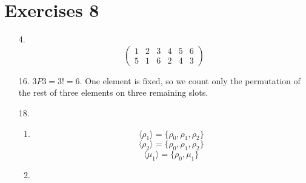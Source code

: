 \documentclass{article}
\begin{document}
\section*{Exercises 8}
\begin{itemize}
\item [4.]
  \[\begin{pmatrix}
    1 & 2 & 3 & 4 & 5 & 6\\
    5 & 1 & 6 & 2 & 4 & 3
  \end{pmatrix}\]
\item [16.]
  $3P3 = 3! = 6$. One element is fixed, so we count only the permutation of the rest of three elements on three remaining slots.
\item [18.]
  \begin{enumerate}[label=\alph*.]
  \item
    \[\langle \rho_1 \rangle = \{\rho_0, \rho_1, \rho_2\}\]
    \[\langle \rho_2 \rangle = \{\rho_0, \rho_1, \rho_2\}\]
    \[\langle \mu_1 \rangle = \{\rho_0, \mu_1\}\]
  \item 
  \end{enumerate}
\end{itemize}
\end{document}
